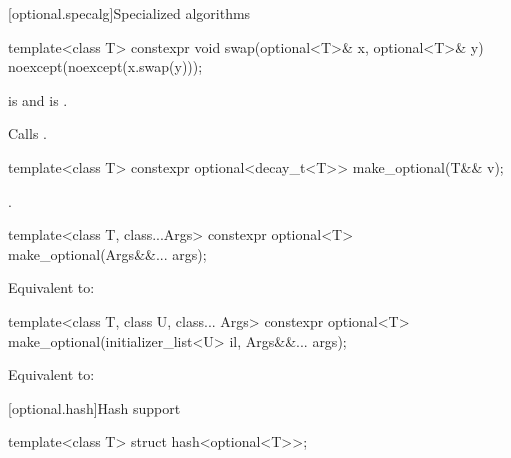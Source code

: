 [optional.specalg]{Specialized algorithms}

%
\begin{itemdecl}
template<class T>
  constexpr void swap(optional<T>& x, optional<T>& y) noexcept(noexcept(x.swap(y)));
\end{itemdecl}

\begin{itemdescr}
\pnum
\constraints
{} is  and
 is .

\pnum
\effects
Calls .
\end{itemdescr}

%
\begin{itemdecl}
template<class T> constexpr optional<decay_t<T>> make_optional(T&& v);
\end{itemdecl}

\begin{itemdescr}
\pnum
\returns
{}.
\end{itemdescr}

%
\begin{itemdecl}
template<class T, class...Args>
  constexpr optional<T> make_optional(Args&&... args);
\end{itemdecl}

\begin{itemdescr}
\pnum
\effects
Equivalent to: 
\end{itemdescr}

%
\begin{itemdecl}
template<class T, class U, class... Args>
  constexpr optional<T> make_optional(initializer_list<U> il, Args&&... args);
\end{itemdecl}

\begin{itemdescr}
\pnum
\effects
Equivalent to: 
\end{itemdescr}

[optional.hash]{Hash support}

%
\begin{itemdecl}
template<class T> struct hash<optional<T>>;
\end{itemdecl}

